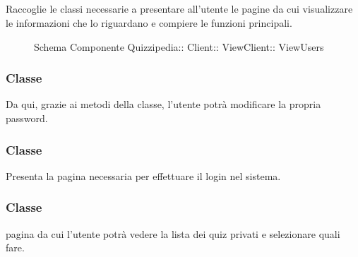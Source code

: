 \subsection{}
Raccoglie le classi necessarie a presentare all'utente le pagine da cui visualizzare le informazioni che lo riguardano e compiere le funzioni principali.
\begin{figure}[H]
\centering
\noindent{}
\caption[Schema Componente ViewUsers]{Schema Componente Quizzipedia:: Client:: ViewClient:: ViewUsers}
\end{figure}
\subsubsection{Classe }
Da qui, grazie ai metodi della classe, l'utente potrà modificare la propria password.
\begin{itemize}
\end{itemize}
\subsubsection{Classe }
Presenta la pagina necessaria per effettuare il login nel sistema.
\begin{itemize}
\end{itemize}
\subsubsection{Classe }
pagina da cui l'utente potrà vedere la lista dei quiz privati e selezionare quali fare.
\begin{itemize}
\end{itemize}
